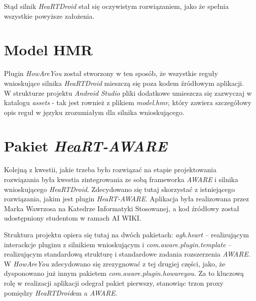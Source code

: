 Stąd silnik \textit{HeaRTDroid} stał się oczywistym rozwiązaniem, jako że spełnia wszystkie powyższe założenia.


\section{Model HMR}
\label{sec:modelHmr}

Plugin \textit{HowAreYou} został stworzony w ten sposób, że wszystkie reguły wnioskujące silnika \textit{HeaRTDroid} mieszczą się poza kodem źródłowym aplikacji. W strukturze projektu \textit{Android Studio} pliki dodatkowe umieszcza się zazwyczaj w katalogu \textit{assets} - tak jest rownież z plikiem \textit{model.hmr}, który zawiera szczegółowy opis reguł w języku zrozumiałym dla silnika wnioskującego.



\section{Pakiet \textit{HeaRT-AWARE}}
\label{sec:pakietHeartAware}

Kolejną z kwestii, jakie trzeba było rozwiązać na etapie projektowania rozwiązania była kwestia zintegrowania ze sobą frameworka \textit{AWARE} i silnika wnioskującego \textit{HeaRTDroid}. Zdecydowano się tutaj skorzystać z istniejącego rozwiązania, jakim jest plugin \textit{HeaRT-AWARE}. Aplikacja była realizowana przez Marka Wawrzosa na Katedrze Informatyki Stosowanej, a kod źródłowy został udostępniony studentom w ramach AI WIKI\cite{heartaware}.

Struktura projektu opiera się tutaj na dwóch pakietach: \textit{agh.heart} -- realizującym interackcje pluginu z silnikiem wnioskującym i \textit{com.aware.plugin.template} -- realizującym standardową strukturę i standardowe zadania rozszerzenia \textit{AWARE}. W \textit{HowAreYou} zdecydowano się zrezygnować z tej drugiej części, jako, że dysponowano już innym pakietem \textit{com.aware.plugin.howareyou}. Za to kluczową rolę w realizacji aplikacji odegrał pakiet pierwszy, stanowiąc trzon proxy pomiędzy \textit{HeaRTDroid}em a \textit{AWARE}.

